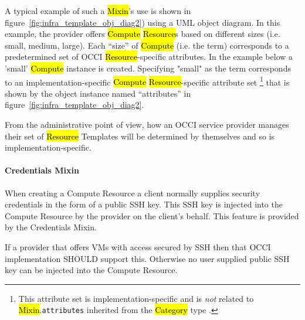 \documentclass[10pt,a4paper]{article}
\begin{document}

A typical example of such a \hl{Mixin}'s use is shown in
figure~\ref{fig:infra_template_obj_diag2}) using a UML object diagram.
In this example, the provider offers \hl{Compute} \hl{Resource}s based
on different sizes (i.e. small, medium, large). Each ``size'' of
\hl{Compute} (i.e. the term) corresponds to a predetermined set of
OCCI \hl{Resource}-specific attributes. In the example below a 'small'
\hl{Compute} instance is created.  Specifying "small" as the term
corresponds to an implementation-specific \hl{Compute}
\hl{Resource}-specific attribute set%
\footnote{This attribute set is implementation-specific and is {\em
    not} related to \hl{Mixin}.{\tt attributes} inherited from the
  \hl{Category} type \cite{occi:core}.}  that is shown by the object
instance named ``attributes'' in
figure~\ref{fig:infra_template_obj_diag2}.


From the administrative point of view, how an OCCI service provider
manages their set of \hl{Resource} Templates will be determined by
themselves and so is implementation-specific.

\paragraph{Credentials Mixin}


When creating a Compute Resource a client normally supplies security credentials in the form of a public SSH key. This SSH key is injected into the Compute Resource by the provider on the client's behalf. This feature is provided by the Credentials Mixin.

If a provider that offers VMs with access secured by SSH then that OCCI implementation SHOULD support this. Otherwise no user supplied public SSH key can be injected into the Compute Resource.
\end{document}
